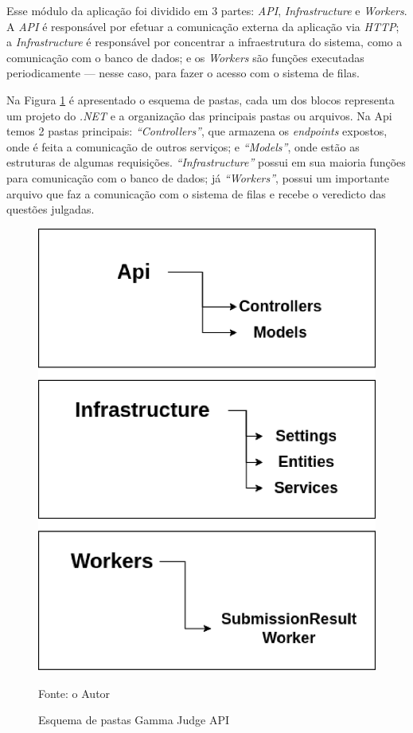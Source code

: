 Esse módulo da aplicação foi dividido em 3 partes: \textit{API}, \textit{Infrastructure} e \textit{Workers}. A \textit{API} é responsável por efetuar a comunicação externa da aplicação via \textit{HTTP}; a \textit{Infrastructure} é responsável por concentrar a infraestrutura do sistema, como a comunicação com o banco de dados; e os \textit{Workers} são funções executadas periodicamente — nesse caso, para fazer o acesso com o sistema de filas.

Na Figura \ref{fig:judge_ui_folders} é apresentado o esquema de pastas, cada um dos blocos representa um projeto do \textit{.NET} e a organização das principais pastas ou arquivos. Na Api temos 2 pastas principais: \textit{“Controllers”}, que armazena os \textit{endpoints} expostos, onde é feita a comunicação de outros serviços; e \textit{“Models”}, onde estão as estruturas de algumas requisições. \textit{“Infrastructure”} possui em sua maioria funções para comunicação com o banco de dados; já  \textit{“Workers”}, possui um importante arquivo que faz a comunicação com o sistema de filas e recebe o veredicto das questões julgadas.

\begin{figure}
    \centering
    \caption{Esquema de pastas Gamma Judge API}
    \includegraphics[keepaspectratio=true,scale=0.5]{figuras/gamma_judge_api_folders.eps}
    \label{fig:judge_ui_folders}
    
    \medskip
    Fonte: o Autor
    \medskip
\end{figure}

